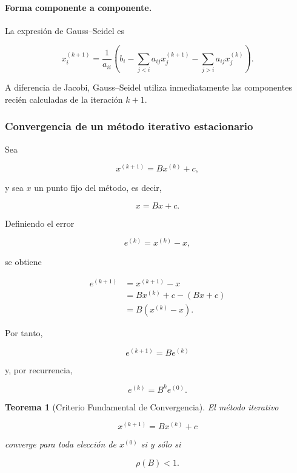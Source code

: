 \documentclass[12pt]{article}
\newtheorem{teorema}{Teorema}
\begin{document}
\paragraph{Forma componente a componente.}

La expresión de Gauss--Seidel es

\[
    \boxed{
    x_i^{(k+1)}
    =
    \frac{1}{a_{ii}}
    \left(
    b_i
    -
    \sum_{j<i}a_{ij}x_j^{(k+1)}
    -
    \sum_{j>i}a_{ij}x_j^{(k)}
    \right).
    }
\]

A diferencia de Jacobi, Gauss--Seidel utiliza inmediatamente las
componentes recién calculadas de la iteración $k+1$.


\subsubsection*{Convergencia de un método iterativo estacionario}

Sea

\[
    x^{(k+1)}=Bx^{(k)}+c,
\]

y sea $x$ un punto fijo del método, es decir,

\[
    x=Bx+c.
\]

Definiendo el error

\[
    e^{(k)}=x^{(k)}-x,
\]

se obtiene

\[
\begin{aligned}
    e^{(k+1)}
    &=
    x^{(k+1)}-x\\
    &=
    Bx^{(k)}+c-(Bx+c)\\
    &=
    B(x^{(k)}-x).
\end{aligned}
\]

Por tanto,

\[
    \boxed{
    e^{(k+1)}=Be^{(k)}
    }
\]

y, por recurrencia,

\[
    \boxed{
    e^{(k)}=B^ke^{(0)}.
    }
\]


\begin{teorema}[Criterio Fundamental de Convergencia]
El método iterativo

\[
    x^{(k+1)}=Bx^{(k)}+c
\]

converge para toda elección de $x^{(0)}$ si y sólo si

\[
    \boxed{
    \rho(B)<1.
    }
\]
\end{teorema}
\end{document}

